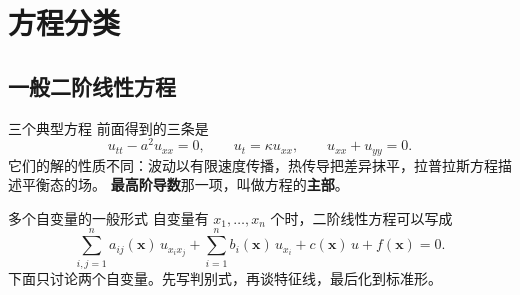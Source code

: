 \documentclass[fontset=windows, chinese, 10pt, xcolor=dvipsnames]{beamer}
\begin{document}




\section{方程分类}

\subsection{一般二阶线性方程}

\begin{frame}{三个典型方程}
  前面得到的三条是
  \begin{equation*}
    u_{tt}-a^2u_{xx}=0,
    \qquad
    u_t=\kappa u_{xx},
    \qquad
    u_{xx}+u_{yy}=0.
  \end{equation*}
  它们的解的性质不同：波动以有限速度传播，热传导把差异抹平，拉普拉斯方程描述平衡态的场。
  \vspace{0.35em}
  \textbf{最高阶导数}那一项，叫做方程的\textbf{主部}。
\end{frame}

\begin{frame}{多个自变量的一般形式}
  自变量有 $x_1,\ldots,x_n$ 个时，二阶线性方程可以写成
  \begin{equation*}
    \sum_{i,j=1}^n a_{ij}(\mathbf{x})\,u_{x_ix_j}
    +\sum_{i=1}^n b_i(\mathbf{x})\,u_{x_i}
    +c(\mathbf{x})\,u+f(\mathbf{x})=0.
   \end{equation*}
  下面只讨论两个自变量。先写判别式，再谈特征线，最后化到标准形。
\end{frame}
\end{document}

